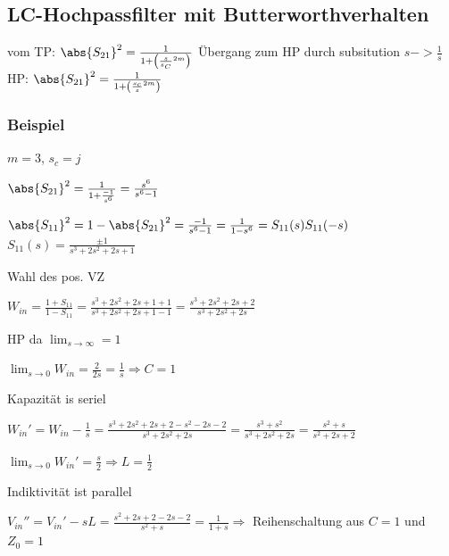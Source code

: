 \subsection{LC-Hochpassfilter mit Butterworthverhalten}

vom TP: $\abs{S_{21}}^2 = \frac{1}{1 + \left(\frac{s}{s_C}^{2m}\right)}$
Übergang zum HP durch subsitution $s->\frac{1}{s}$
HP: $\abs{S_{21}}^2 = \frac{1}{1 + \left(\frac{s_c}{s}^{2m}\right)}$

\subsubsection{Beispiel}

$m = 3$, $s_c = j $

$\abs{S_{21}}^2 = \frac{1}{1 + \frac{-1}{s^6}} = \frac{s^6}{s^6 - 1}$

$\abs{S_{11}}^2 = 1 - \abs{S_{21}}^2 = \frac{-1}{s^6 -1} = \frac{1}{1 - s^6} = S_{11}(s) S_{11}(-s)$
$S_{11}(s) = \frac{\pm 1}{s^3 + 2s^2 + 2s + 1}$

Wahl des pos. VZ 
\begin{pitemize}
    \item $W_{in} = \frac{1 + S_{11}}{1 - S_{11}} = \frac{s^3 + 2s^2 + 2s + 1 + 1}{s^3 + 2s^2 + 2s + 1 - 1} = \frac{s^3 + 2s^2 + 2s + 2}{s^3 + 2s^2 + 2s}$
    \item HP da $\lim_{s\rightarrow\infty} = 1$
    \item $\lim_{s\rightarrow0}\limits W_{in}= \frac{2}{2s} = \frac{1}{s} \Rightarrow C = 1$
    \item Kapazität is seriel
    \item $W_{in}' = W_{in} - \frac{1}{s} = \frac{s^3 + 2s^2 + 2s + 2 - s^2 - 2s - 2}{s^3 + 2s^2 + 2s} = \frac{s^3 + s^2}{s^3 + 2s^2 + 2s} = \frac{s^2 + s}{s^2 + 2s + 2}$
    \item $\lim_{s\rightarrow0}\limits W_{in}' = \frac{s}{2} \Rightarrow L = \frac{1}{2}$
    \item Indiktivität ist parallel 
    \item $V_{in}'' = V_{in}' - sL = \frac{s^2 + 2s + 2 - 2s - 2}{s^2 + s} = \frac{1}{1 + s} \Rightarrow$ Reihenschaltung aus $C = 1$ und $Z_0 = 1$ 
    \item {}
\end{pitemize}

